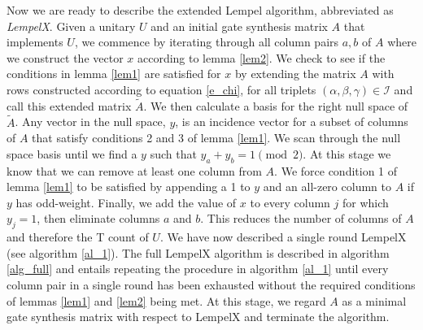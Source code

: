 \documentclass{article}
\theoremstyle{definition}
\theoremstyle{problem}
\theoremstyle{lemma}
\begin{document}
		Now we are ready to describe the extended Lempel algorithm, abbreviated as \emph{LempelX}. Given a unitary $U$ and an initial gate synthesis matrix $A$ that implements $U$, we commence by iterating through all column pairs $a,b$ of $A$ where we construct the vector $x$ according to lemma \ref{lem2}. We check to see if the conditions in lemma \ref{lem1} are satisfied for $x$ by extending the matrix $A$ with rows constructed according to equation \ref{e_chi}, for all triplets $(\alpha,\beta,\gamma) \in \mathcal{I}$ and call this extended matrix $\tilde{A}$. We then calculate a basis for the right null space of $\tilde{A}$. Any vector in the null space, $y$, is an incidence vector for a subset of columns of $A$ that satisfy conditions 2 and 3 of lemma \ref{lem1}. We scan through the null space basis until we find a $y$ such that $y_a + y_b = 1 \pmod{2}$. At this stage we know that we can remove at least one column from $A$. We force condition 1 of lemma \ref{lem1} to be satisfied by appending a 1 to $y$ and an all-zero column to $A$ if $y$ has odd-weight. Finally, we add the value of $x$ to every column $j$ for which $y_j = 1$, then eliminate columns $a$ and $b$. This reduces the number of columns of $A$ and therefore the T count of $U$. We have now described a single round LempelX (see algorithm \ref{al_1}). The full LempelX algorithm is described in algorithm \ref{alg_full} and entails repeating the procedure in algorithm \ref{al_1} until every column pair in a single round has been exhausted without the required conditions of lemmas \ref{lem1} and \ref{lem2} being met. At this stage, we regard $A$ as a minimal gate synthesis matrix with respect to LempelX and terminate the algorithm.
		
\end{document}
